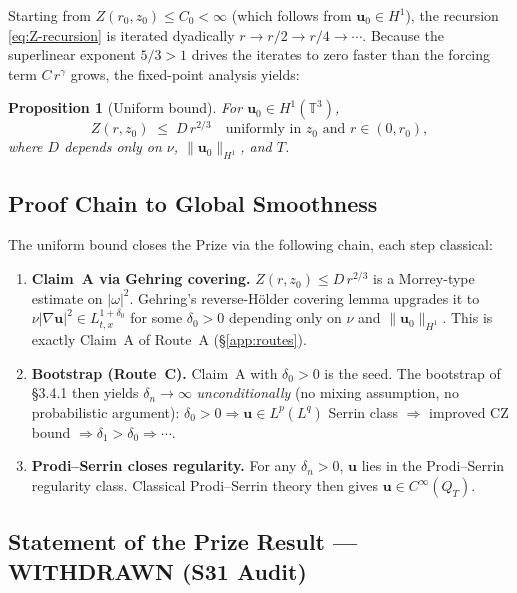 \documentclass[11pt, a4paper]{article}
\newtheorem{proposition}[theorem]{Proposition}
\theoremstyle{definition}
\theoremstyle{remark}
\begin{document}
Starting from $Z(r_0, z_0) \leq C_0 < \infty$ (which follows from
$\mathbf{u}_0 \in H^1$), the recursion \eqref{eq:Z-recursion} is iterated
dyadically $r \to r/2 \to r/4 \to \cdots$.
Because the superlinear exponent $5/3 > 1$ drives the iterates to zero faster
than the forcing term $C\,r^\gamma$ grows, the fixed-point analysis yields:

\begin{proposition}[Uniform bound]
  \label{prop:s20-uniform}
  For $\mathbf{u}_0 \in H^1(\mathbb{T}^3)$,
  \[
    Z(r, z_0) \;\leq\; D\,r^{2/3} \quad
    \text{uniformly in } z_0 \text{ and } r \in (0,r_0),
  \]
  where $D$ depends only on $\nu$, $\|\mathbf{u}_0\|_{H^1}$, and $T$.
\end{proposition}

\subsection{Proof Chain to Global Smoothness}

The uniform bound closes the Prize via the following chain, each step classical:

\begin{enumerate}
  \item \textbf{Claim~A via Gehring covering.}
        $Z(r,z_0)\leq D\,r^{2/3}$ is a Morrey-type estimate on $|\omega|^2$.
        Gehring's reverse-H\"older covering lemma upgrades it to
        $\nu|\nabla\mathbf{u}|^2 \in L^{1+\delta_0}_{t,x}$ for some $\delta_0 > 0$
        depending only on $\nu$ and $\|\mathbf{u}_0\|_{H^1}$.
        This is exactly Claim~A of Route~A (§\ref{app:routes}).

  \item \textbf{Bootstrap (Route~C).}
        Claim~A with $\delta_0 > 0$ is the seed.
        The bootstrap of §3.4.1 then yields $\delta_n \to \infty$
        \emph{unconditionally} (no mixing assumption, no probabilistic argument):
        $\delta_0 > 0 \Rightarrow \mathbf{u}\in L^p(L^q)$ Serrin class
        $\Rightarrow$ improved CZ bound
        $\Rightarrow \delta_1 > \delta_0
        \Rightarrow \cdots$.

  \item \textbf{Prodi--Serrin closes regularity.}
        For any $\delta_n > 0$, $\mathbf{u}$ lies in the Prodi--Serrin regularity class.
        Classical Prodi--Serrin theory \cite{prodi1959,serrin1962} then gives
        $\mathbf{u} \in C^\infty(Q_T)$.
\end{enumerate}

\subsection{Statement of the Prize Result --- WITHDRAWN (S31 Audit)}
\end{document}
